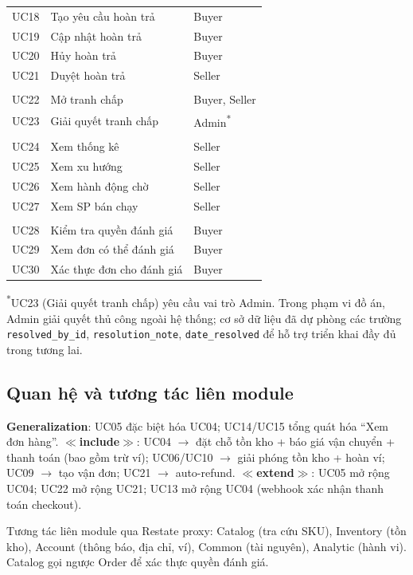\begin{longtable}{@{} c L{7.5cm} L{4cm} @{}}
UC18 & Tạo yêu cầu hoàn trả & Buyer \\
UC19 & Cập nhật hoàn trả & Buyer \\
UC20 & Hủy hoàn trả & Buyer \\
UC21 & Duyệt hoàn trả & Seller \\
 \\
UC22 & Mở tranh chấp & Buyer, Seller \\
UC23 & Giải quyết tranh chấp & Admin\textsuperscript{*} \\
 \\
UC24 & Xem thống kê & Seller \\
UC25 & Xem xu hướng & Seller \\
UC26 & Xem hành động chờ & Seller \\
UC27 & Xem SP bán chạy & Seller \\
 \\
UC28 & Kiểm tra quyền đánh giá & Buyer \\
UC29 & Xem đơn có thể đánh giá & Buyer \\
UC30 & Xác thực đơn cho đánh giá & Buyer \\
\end{longtable}
\normalsize

\noindent\textsuperscript{*}UC23 (Giải quyết tranh chấp) yêu cầu vai trò Admin. Trong phạm vi đồ án, Admin giải quyết thủ công ngoài hệ thống; cơ sở dữ liệu đã dự phòng các trường \texttt{resolved\_by\_id}, \texttt{resolution\_note}, \texttt{date\_resolved} để hỗ trợ triển khai đầy đủ trong tương lai.

\subsection{Quan hệ và tương tác liên module}

\textbf{Generalization}: UC05 đặc biệt hóa UC04; UC14/UC15 tổng quát hóa ``Xem đơn hàng''. \textbf{$\ll$include$\gg$}: UC04 $\rightarrow$ đặt chỗ tồn kho + báo giá vận chuyển + thanh toán (bao gồm trừ ví); UC06/UC10 $\rightarrow$ giải phóng tồn kho + hoàn ví; UC09 $\rightarrow$ tạo vận đơn; UC21 $\rightarrow$ auto-refund. \textbf{$\ll$extend$\gg$}: UC05 mở rộng UC04; UC22 mở rộng UC21; UC13 mở rộng UC04 (webhook xác nhận thanh toán checkout).

Tương tác liên module qua Restate proxy: Catalog (tra cứu SKU), Inventory (tồn kho), Account (thông báo, địa chỉ, ví), Common (tài nguyên), Analytic (hành vi). Catalog gọi ngược Order để xác thực quyền đánh giá.
